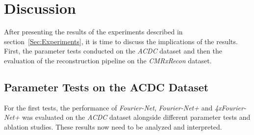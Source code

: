 
\chapter{Discussion} \label{Ch:Discussion}
After presenting the results of the experiments described in section~\ref{Sec:Experiments}, it is time to discuss the implications of the results. First, the parameter tests conducted on the \emph{ACDC} dataset and then the evaluation of the reconstruction pipeline on the \emph{CMRxRecon} dataset.

\section{Parameter Tests on the ACDC Dataset} \label{Sec:DiscussionParameterTestsACDC}
For the first tests, the performance of \emph{Fourier-Net}, \emph{Fourier-Net+} and \emph{4xFourier-Net+} was evaluated on the \emph{ACDC} dataset alongside different parameter tests and ablation studies. These results now need to be analyzed and interpreted.

